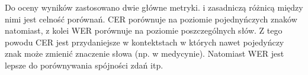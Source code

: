Do oceny wyników zastosowano dwie główne metryki.  i  zasadniczą różnicą między nimi
jest celność porównań. CER porównuje na poziomie pojednyńczych znaków natomiast, z kolei WER porównuje na poziomie 
poszczególnych słów. Z tego powodu CER jest przydaniejsze w kontektstach w których nawet pojedyńczy znak może zmienić
znaczenie słowa (np. w medycynie). Natomiast WER jest lepsze do porównywania spójności zdań itp.
